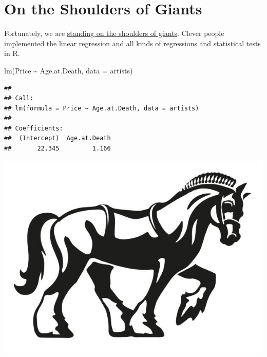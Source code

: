 \documentclass[
]{book}
\newenvironment{Shaded}{\begin{snugshade}}{\end{snugshade}}
\newcommand{\AttributeTok}[1]{\textcolor[rgb]{0.77,0.63,0.00}{#1}}
\newcommand{\FunctionTok}[1]{\textcolor[rgb]{0.00,0.00,0.00}{#1}}
\newcommand{\NormalTok}[1]{#1}
\newcommand{\SpecialCharTok}[1]{\textcolor[rgb]{0.00,0.00,0.00}{#1}}
\begin{document}
\hypertarget{on-the-shoulders-of-giants}{%
\section{On the Shoulders of Giants}\label{on-the-shoulders-of-giants}}

Fortunately, we are \href{https://en.wikipedia.org/wiki/Standing_on_the_shoulders_of_giants}{standing on the shoulders of giants}. Clever people implemented the linear regression and all kinds of regressions and statistical tests in R.

\begin{Shaded}
\begin{Highlighting}[]
\FunctionTok{lm}\NormalTok{(Price }\SpecialCharTok{\textasciitilde{}}\NormalTok{ Age.at.Death, }\AttributeTok{data =}\NormalTok{ artists)}
\end{Highlighting}
\end{Shaded}

\begin{verbatim}
## 
## Call:
## lm(formula = Price ~ Age.at.Death, data = artists)
## 
## Coefficients:
##  (Intercept)  Age.at.Death  
##       22.345         1.166
\end{verbatim}

\includegraphics{images/workhorse.jpg}

  
\end{document}
